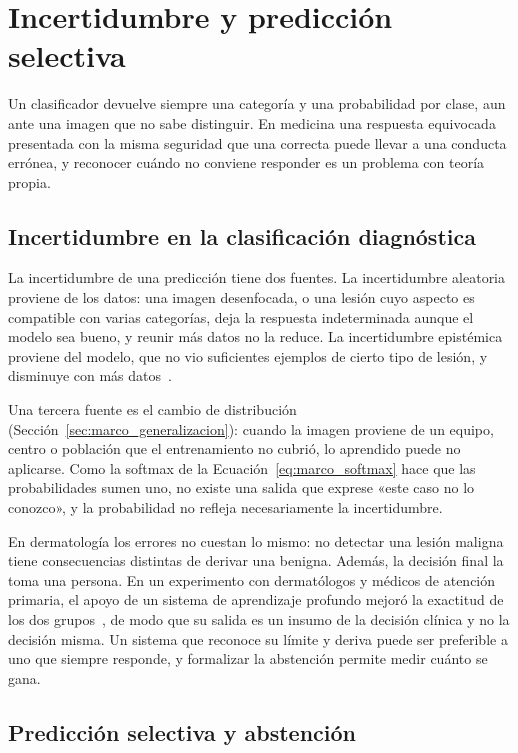 \section{Incertidumbre y predicción selectiva}
\label{sec:marco_incertidumbre}

Un clasificador devuelve siempre una categoría y una probabilidad por clase, aun ante una imagen que no sabe
distinguir. En medicina una respuesta equivocada presentada con la misma seguridad que una correcta puede
llevar a una conducta errónea, y reconocer cuándo no conviene responder es un problema con teoría propia.

\subsection{Incertidumbre en la clasificación diagnóstica}
\label{sec:marco_incert_fuentes}

La incertidumbre de una predicción tiene dos fuentes. La incertidumbre aleatoria proviene de los datos: una
imagen desenfocada, o una lesión cuyo aspecto es compatible con varias categorías, deja la respuesta
indeterminada aunque el modelo sea bueno, y reunir más datos no la reduce. La incertidumbre epistémica
proviene del modelo, que no vio suficientes ejemplos de cierto tipo de lesión, y disminuye con más
datos~\cite{kendall2017uncertainties}.

Una tercera fuente es el cambio de distribución (Sección~\ref{sec:marco_generalizacion}): cuando la imagen
proviene de un equipo, centro o población que el entrenamiento no cubrió, lo aprendido puede no aplicarse.
Como la softmax de la Ecuación~\ref{eq:marco_softmax} hace que las probabilidades sumen uno, no existe una
salida que exprese «este caso no lo conozco», y la probabilidad no refleja necesariamente la incertidumbre.

En dermatología los errores no cuestan lo mismo: no detectar una lesión maligna tiene consecuencias
distintas de derivar una benigna. Además, la decisión final la toma una persona. En un experimento con
dermatólogos y médicos de atención primaria, el apoyo de un sistema de aprendizaje profundo mejoró la
exactitud de los dos grupos~\cite{groh2024learningaided}, de modo que su salida es un insumo de la decisión
clínica y no la decisión misma. Un sistema que reconoce su límite y deriva puede ser preferible a uno que
siempre responde, y formalizar la abstención permite medir cuánto se gana.

\subsection{Predicción selectiva y abstención}
\label{sec:marco_pred_selectiva}

